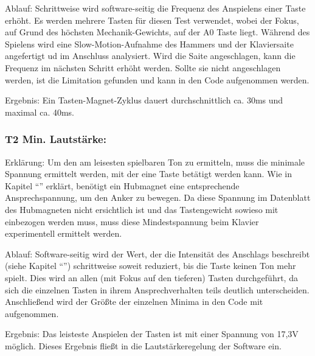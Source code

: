 Ablauf: Schrittweise wird software-seitig die Frequenz des Anspielens einer Taste erhöht.
Es werden mehrere Tasten für diesen Test verwendet, wobei der Fokus, auf Grund des höchsten Mechanik-Gewichts, auf der A0 Taste liegt. %
Während des Spielens wird eine Slow-Motion-Aufnahme des Hammers und der Klaviersaite angefertigt ud im Anschluss analysiert.
Wird die Saite angeschlagen, kann die Frequenz im nächsten Schritt erhöht werden.
Sollte sie nicht angeschlagen werden, ist die Limitation gefunden und kann in den Code aufgenommen werden.

Ergebnis: Ein Tasten-Magnet-Zyklus dauert durchschnittlich ca. 30ms und maximal ca. 40ms.

\subsubsection{T2 Min. Lautstärke:}

Erklärung: Um den am leisesten spielbaren Ton zu ermitteln, muss die minimale Spannung ermittelt werden, mit der eine Taste betätigt werden kann.
Wie in Kapitel \enquote{} erklärt, benötigt ein Hubmagnet eine entsprechende Ansprechspannung, um den Anker zu bewegen.
Da diese Spannung im Datenblatt des Hubmagneten nicht ersichtlich ist und das Tastengewicht sowieso mit einbezogen werden muss, muss diese Mindestspannung beim Klavier experimentell ermittelt werden.

Ablauf: Software-seitig wird der Wert, der die Intensität des Anschlags beschreibt (siehe Kapitel \enquote{}) schrittweise soweit reduziert, bis die Taste keinen Ton mehr spielt.
Dies wird an allen (mit Fokus auf den tieferen) Tasten durchgeführt, da sich die einzelnen Tasten in ihrem Ansprechverhalten teils deutlich unterscheiden. %
Anschließend wird der Größte der einzelnen Minima in den Code mit aufgenommen.

Ergebnis: Das leisteste Anspielen der Tasten ist mit einer Spannung von 17,3V möglich.
Dieses Ergebnis fließt in die Lautstärkeregelung der Software ein.


